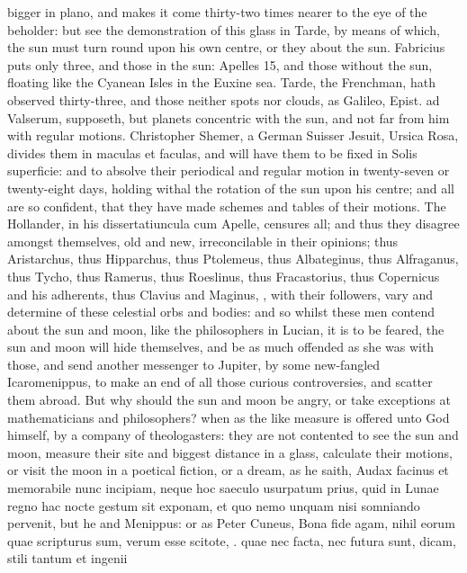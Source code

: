 {bigger in plano, and makes it come thirty-two times nearer to the eye
of the beholder: but see the demonstration of this glass in
Tarde, by means of which, the sun must turn round upon his own
centre, or they about the sun. Fabricius puts only three, and those in
the sun: Apelles 15, and those without the sun, floating like the
Cyanean Isles in the Euxine sea. Tarde, the Frenchman, hath
observed thirty-three, and those neither spots nor clouds, as Galileo,
Epist. ad Valserum, supposeth, but planets concentric with the sun, and
not far from him with regular motions. Christopher Shemer, a
German Suisser Jesuit, Ursica Rosa, divides them in maculas et faculas,
and will have them to be fixed in Solis superficie: and to absolve
their periodical and regular motion in twenty-seven or twenty-eight
days, holding withal the rotation of the sun upon his centre; and all
are so confident, that they have made schemes and tables of their
motions. The Hollander, in his dissertatiuncula cum Apelle,
censures all; and thus they disagree amongst themselves, old and new,
irreconcilable in their opinions; thus Aristarchus, thus Hipparchus,
thus Ptolemeus, thus Albateginus, thus Alfraganus, thus Tycho, thus
Ramerus, thus Roeslinus, thus Fracastorius, thus Copernicus and his
adherents, thus Clavius and Maginus, \etc{}, with their followers, vary
and determine of these celestial orbs and bodies: and so whilst these
men contend about the sun and moon, like the philosophers in Lucian, it
is to be feared, the sun and moon will hide themselves, and be as much
offended as she was with those, and send another messenger to
Jupiter, by some new-fangled Icaromenippus, to make an end of all those
curious controversies, and scatter them abroad.
But why should the sun and moon be angry, or take exceptions at
mathematicians and philosophers? when as the like measure is offered
unto God himself, by a company of theologasters: they are not contented
to see the sun and moon, measure their site and biggest distance in a
glass, calculate their motions, or visit the moon in a poetical
fiction, or a dream, as he saith, Audax facinus et memorabile
nunc incipiam, neque hoc saeculo usurpatum prius, quid in Lunae regno
hac nocte gestum sit exponam, et quo nemo unquam nisi somniando
pervenit, but he and Menippus: or as Peter Cuneus, Bona
fide agam, nihil eorum quae scripturus sum, verum esse scitote, \etc{}.
quae nec facta, nec futura sunt, dicam, stili tantum et ingenii
}
